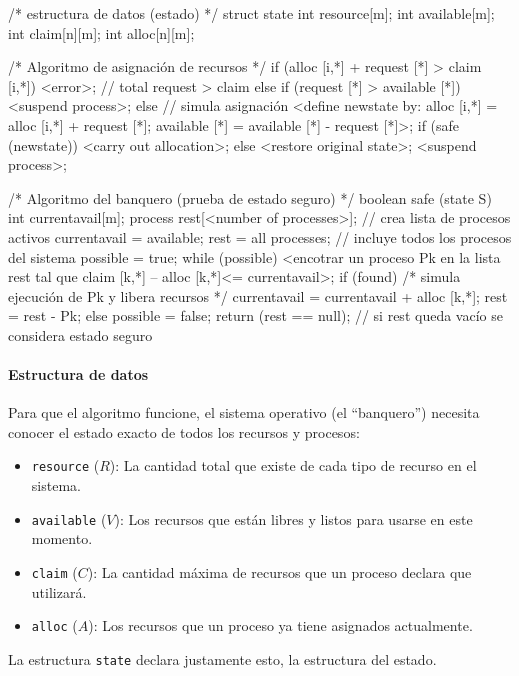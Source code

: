 \begin{ccode}[title=Algoritmo del banquero]
/* estructura de datos (estado) */
struct state {
  int resource[m];
  int available[m];
  int claim[n][m];
  int alloc[n][m];
}

/* Algoritmo de asignación de recursos */ 
if (alloc [i,*] + request [*] > claim [i,*])
  <error>;  // total request > claim 
else if (request [*] > available [*])
  <suspend process>;
else { // simula asignación
  <define newstate by:
   alloc [i,*] = alloc [i,*] + request [*];
   available [*] = available [*] - request [*]>;
}
if (safe (newstate))
  <carry out allocation>;
else {
  <restore original state>;
  <suspend process>;
}

/* Algoritmo del banquero (prueba de estado seguro) */
boolean safe (state S) {
  int currentavail[m];
  process rest[<number of processes>]; // crea lista de procesos activos
  currentavail = available;
  rest = {all processes}; // incluye todos los procesos del sistema
  possible = true;
  while (possible) {
    <encotrar un proceso Pk en la lista rest tal que
    claim [k,*] – alloc [k,*]<= currentavail>; 
    if (found) {
    /* simula ejecución de Pk y libera recursos */
      currentavail = currentavail + alloc [k,*];
      rest = rest - {Pk};
    } else possible = false; 
  }
  return (rest == null); // si rest queda vacío se considera estado seguro
}
\end{ccode}

\paragraph{Estructura de datos}
Para que el algoritmo funcione, el sistema operativo (el ``banquero'') necesita conocer el estado exacto de todos los recursos y procesos:
\begin{itemize}
  \item \texttt{resource} (\(R\)): La cantidad total que existe de cada tipo de recurso en el sistema.
  \item \texttt{available} (\(V\)): Los recursos que están libres y listos para usarse en este momento.
  \item \texttt{claim} (\(C\)): La cantidad máxima de recursos que un proceso declara que utilizará.
  \item \texttt{alloc} (\(A\)): Los recursos que un proceso ya tiene asignados actualmente.
\end{itemize}
La estructura \texttt{state} declara justamente esto, la estructura del estado.

